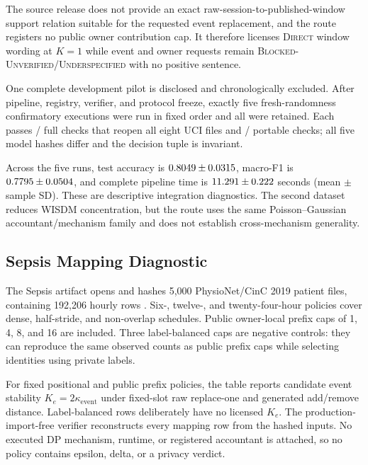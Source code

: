 \documentclass[letterpaper]{article} %
\newcommand{\Direct}{\textsc{Direct}}
\newcommand{\Under}{\textsc{Underspecified}}
\newcommand{\ke}{\kappa_{\mathrm{event}}}
\begin{document}
The source release does not provide an exact raw-session-to-published-window
support relation suitable for the requested event replacement, and the route
registers no public owner contribution cap.  It therefore licenses
\Direct{} window wording at $K=1$ while event and owner requests remain
\textsc{Blocked-Unverified}/\Under{} with no positive sentence.



One complete development pilot is disclosed and chronologically excluded.
After pipeline, registry, verifier, and protocol freeze, exactly five
fresh-randomness confirmatory executions were run in fixed order and all were
retained.  Each passes \AuditUciFullCheckCount/\AuditUciFullCheckCount{}
full checks that reopen all eight UCI files and
\AuditUciPortableCheckCount/\AuditUciPortableCheckCount{} portable checks;
all five model hashes differ and the decision tuple is invariant.



Across the five runs, test accuracy is
$0.8049\pm0.0315$, macro-F1 is
$0.7795\pm0.0504$, and complete pipeline time
is $11.291\pm0.222$ seconds (mean $\pm$ sample
SD).  These are descriptive integration diagnostics.  The second dataset
reduces WISDM concentration, but the route uses the same
Poisson--Gaussian accountant/mechanism family and does not establish
cross-mechanism generality.

\subsection{Sepsis Mapping Diagnostic}

The Sepsis artifact opens and hashes 5,000 PhysioNet/CinC 2019 patient files,
containing 192,206 hourly rows
\citep{reyna2020sepsis,physionet2019sepsis,pollard2026physionet,goldberger2000physionet}.  Six-, twelve-, and
twenty-four-hour policies cover dense, half-stride, and non-overlap schedules.
Public owner-local prefix caps of 1, 4, 8, and 16 are included.  Three
label-balanced caps are negative controls: they can reproduce the same
observed counts as public prefix caps while selecting identities using private
labels.

For fixed positional and public prefix policies, the table reports candidate
event stability $K_e=2\ke$ under fixed-slot raw replace-one and generated
add/remove distance.  Label-balanced rows deliberately have no licensed
$K_e$.  The production-import-free verifier reconstructs every mapping row from
the hashed inputs.  No executed DP mechanism, runtime, or registered
accountant is attached, so no policy contains epsilon, delta, or a privacy
verdict.
\end{document}
